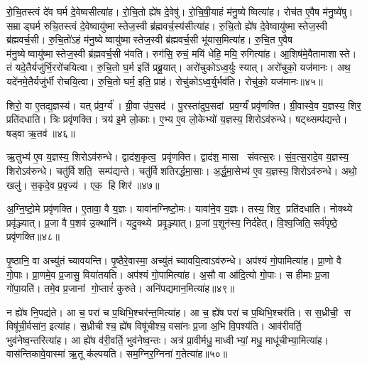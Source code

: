 रो॒चि॒तस्त्वं दे॑व घर्म दे॒वेष्वसीत्या॑ह। रो॒चि॒तो ह्ये॑ष दे॒वेषु॑। रो॒चि॒षी॒याहं म॑नु॒ष्येष्वित्या॑ह। रोच॑त ए॒वैष म॑नु॒ष्ये॑षु। सम्राड्घर्म रुचि॒तस्त्वं दे॒वेष्वायु॑ष्मास्तेज॒स्वी ब्र॑ह्मवर्च॒स्य॑सीत्या॑ह। रु॒चि॒तो ह्ये॑ष दे॒वेष्वायु॑ष्मास्तेज॒स्वी ब्र॑ह्मवर्च॒सी। रु॒चि॒तो॑ऽहं म॑नु॒ष्येष्वायु॑ष्मास्तेज॒स्वी ब्र॑ह्मवर्च॒सी भू॑यास॒मित्या॑ह। रु॒चि॒त ए॒वैष म॑नु॒ष्येष्वायु॑ष्मास्तेज॒स्वी ब्र॑ह्मवर्च॒सी भ॑वति। रुग॑सि॒ रुचं॒ मयि॑ धेहि॒ मयि॒ रुगित्या॑ह। आ॒शिष॑मे॒वैतामाशास्ते। तं यदे॒तैर्यजु॑र्भि॒ररो॑चयित्वा। रु॒चि॒तो घ॒र्म इति॑ प्रब्रू॒यात्। अरो॑चुकोऽध्व॒र्युः स्यात्। अरो॑चुको॒ यज॑मानः। अथ॒ यदे॑नमे॒तैर्यजु॑र्भी रोचयि॒त्वा। रु॒चि॒तो घर्म॒ इति॒ प्राह॑। रोचु॑कोऽध्व॒र्युर्भव॑ति। रोचु॑को॒ यज॑मानः॥४५॥
\anuvakamend[प॒श्चाद्रो॑चयति॒ जाग॑तेन॒ छन्द॑सा॒ पाङ्क्ते॑न॒ छन्द॑सा॒ समा॑रुचि॒तो रो॑च॒येत्या॑हा॒शिष॑मे॒वैतामाशास्ते शास्ते॒ऽष्टौ च॑]

शिरो॒ वा ए॒तद्य॒ज्ञस्य॑। यत् प्र॑व॒र्ग्य॑। ग्री॒वा उ॑प॒सद॑। पु॒रस्ता॑दुप॒सदां प्रव॒र्ग्यं॑ प्रवृ॑णक्ति। ग्री॒वास्वे॒व य॒ज्ञस्य॒ शिर॒ प्रति॑दधाति। त्रिः प्रवृ॑णक्ति। त्रय॑ इ॒मे लो॒काः। ए॒भ्य ए॒व लो॒केभ्यो॑ य॒ज्ञस्य॒ शिरोऽव॑रुन्धे। षट्थ्सम्प॑द्यन्ते। षड्वा ऋ॒तव॑॥४६॥

ऋ॒तुभ्य॑ ए॒व य॒ज्ञस्य॒ शिरोऽव॑रुन्धे। द्वाद॑श॒कृत्व॒ प्रवृ॑णक्ति। द्वाद॑श॒ मासा संवत्स॒रः। सं॒व॒त्स॒रादे॒व य॒ज्ञस्य॒ शिरोऽव॑रुन्धे। चतु॑र्विशति॒ सम्प॑द्यन्ते। चतु॑र्विशतिरर्द्धमा॒साः। अ॒र्द्ध॒मा॒सेभ्य॑ ए॒व य॒ज्ञस्य॒ शिरोऽव॑रुन्धे। अथो॒ खलु॑। स॒कृदे॒व प्र॒वृज्य॑। एक॒ हि शिर॑॥४७॥

अ॒ग्नि॒ष्टो॒मे प्रवृ॑णक्ति। ए॒तावा॒\an{} वै य॒ज्ञः। यावा॑नग्निष्टो॒मः। यावा॑ने॒व य॒ज्ञः। तस्य॒ शिर॒ प्रति॑दधाति। नोक्थ्ये प्रवृ॑ञ्ज्यात्। प्र॒जा वै प॒शव॑ उ॒क्थानि॑। यदु॒क्थ्ये प्रवृ॒ञ्ज्यात्। प्र॒जां प॒शून॑स्य॒ निर्द॑हेत्। वि॒श्व॒जिति॒ सर्व॑पृष्ठे॒ प्रवृ॑णक्ति॥४८॥

पृ॒ष्ठानि॒ वा अच्यु॑तं च्यावयन्ति। पृ॒ष्ठैरे॒वास्मा॒ अच्यु॑तं च्यावयि॒त्वाऽव॑रुन्धे। अप॑श्यं गो॒पामित्या॑ह। प्रा॒णो वै गो॒पाः। प्रा॒णमे॒व प्र॒जासु॒ विया॑तयति। अप॑श्यं गो॒पामित्या॑ह। अ॒सौ वा आ॑दि॒त्यो गो॒पाः। स हीमाः प्र॒जा गो॑पा॒यति॑। तमे॒व प्र॒जानां गो॒प्तारं॑ कुरुते। अनि॑पद्यमान॒मित्या॑ह॥४९॥

न ह्ये॑ष नि॒पद्य॑ते। आ च॒ परा॑ च प॒थिभि॒श्चर॑न्त॒मित्या॑ह। आ च॒ ह्ये॑ष परा॑ च प॒थिभि॒श्चर॑ति। स स॒ध्रीची॒ स विषू॑ची॒र्वसा॑न॒ इत्या॑ह। स॒ध्रीचीश्च॒ ह्ये॑ष विषू॑चीश्च॒ वसा॑नः प्र॒जा अ॒भि वि॒पश्य॑ति। आव॑रीवर्ति॒ भुव॑नेष्व॒न्तरित्या॑ह। आ ह्ये॑ष व॑री॒वर्ति॒ भुव॑नेष्व॒न्तः। अत्र॑ प्रा॒वीर्मधु॒ माध्वीभ्यां॒ मधु॒ माधू॑चीभ्या॒मित्या॑ह। वास॑न्तिकावे॒वास्मा॑ ऋ॒तू क॑ल्पयति। सम॒ग्निर॒ग्निना॑ ग॒तेत्या॑ह॥५०॥

